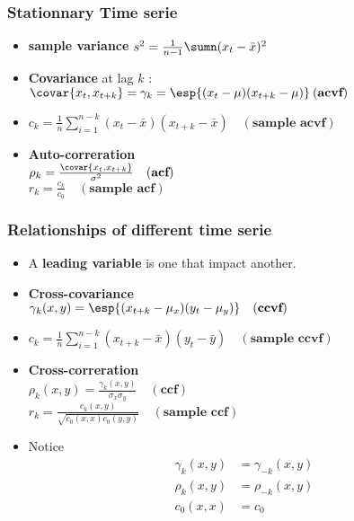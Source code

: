 \documentclass[10pt, french]{article}
\begin{document}
\begin{multicols*}{3}
\subsubsection*{Stationnary Time serie}
\begin{itemize}[align=left,leftmargin=*]
    \item \textbf{sample variance} $s^2 = \frac{1}{n-1} \sumn (x_t - \bar{x})^2$
    \item \textbf{Covariance} at lag $k$ : \\
    $\covar{x_t,x_{t+k}} = \gamma_k = \esp{(x_t - \mu)(x_{t+k} - \mu)} \: (\textbf{acvf}) $
    \item[] $c_k = \frac{1}{n} \sum_{i=1}^{n-k} (x_t - \bar{x})(x_{t+k} - \bar{x})\quad (\textbf{sample acvf})$
    \item \textbf{Auto-correration} \\
     $\rho_k = \frac{\covar{x_t,x_{t+k}}}{\sigma^2}\quad (\textbf{acf})$ \\
    $r_k = \frac{c_k}{c_0}\quad (\textbf{sample acf})$
\end{itemize}
\subsubsection*{Relationships of different time serie}
\begin{itemize}[align=left,leftmargin=*]
   \item A \textbf{leading variable} is one that impact another.
   \item \textbf{Cross-covariance} \\
    $\gamma_k(x,y) = \esp{(x_{t+k} - \mu_x)(y_t - \mu_y)} \quad (\textbf{ccvf}) $
    \item[] $c_k = \frac{1}{n} \sum\limits_{i=1}^{n-k} (x_{t+k} - \bar{x})(y_t - \bar{y})\quad (\textbf{sample ccvf})$
    \item \textbf{Cross-correration} \\
     $\rho_k(x,y) = \frac{\gamma_k(x,y)}{\sigma_x \sigma_y}\quad (\textbf{ccf}) $ \\
    $r_k = \frac{c_k(x,y)}{\sqrt{c_0(x,x)c_0(y,y)}}\quad (\textbf{sample ccf})$
    \item Notice
    \begin{align*}
      \gamma_k(x,y) &= \gamma_{-k}(x,y) \\
      \rho_k(x,y) &= \rho_{-k}(x,y) \\
       c_0(x,x) &= c_0
    \end{align*}
\end{itemize}


\end{multicols*}
\end{document}
